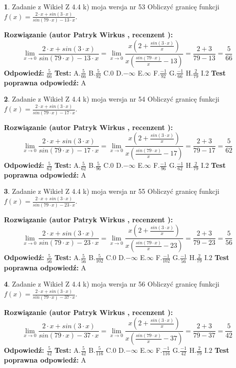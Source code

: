 \documentclass[12pt, a4paper]{article}
\theoremstyle{definition} %
\newtheorem{zad}{}
\newcommand{\zadStart}[1]{\begin{zad}#1\newline}
\newcommand{\zadStop}{\end{zad}}
\newcommand{\rozwStart}[2]{\noindent \textbf{Rozwiązanie (autor #1 , recenzent #2): }\newline}
\newcommand{\rozwStop}{\newline}
\newcommand{\odpStart}{\noindent \textbf{Odpowiedź:}\newline}
\newcommand{\odpStop}{\newline}
\newcommand{\testStart}{\noindent \textbf{Test:}\newline}
\newcommand{\testStop}{\newline}
\newcommand{\kluczStart}{\noindent \textbf{Test poprawna odpowiedź:}\newline}
\newcommand{\kluczStop}{\newline}
\begin{document}
\zadStart{Zadanie z Wikieł Z 4.4 k) moja wersja nr 53}
Obliczyć granicę funkcji $f(x)=\frac{2\cdot x +sin(3\cdot x)}{sin(79\cdot x) -13\cdot x}$.
\zadStop
\rozwStart{Patryk Wirkus}{}
$$\lim\limits_{x\to 0}\frac{2\cdot x +sin(3\cdot x)}{sin(79\cdot x) -13\cdot x}
=\lim\limits_{x\to 0}\frac{x(2+\frac{sin(3\cdot x)}{x})}{x(\frac{sin(79\cdot x)}{x}-13)}
=\frac{2+3}{79-13} = \frac{5}{66}$$
\rozwStop
\odpStart
$\frac{5}{66}$
\odpStop
\testStart
A.$\frac{5}{66}$
B.$\frac{5}{92}$
C.$0$
D.$-\infty$
E.$\infty$
F.$\frac{-1}{92}$
G.$\frac{-1}{66}$
H.$\frac{2}{79}$
I.$2$
\testStop
\kluczStart
A
\kluczStop



\zadStart{Zadanie z Wikieł Z 4.4 k) moja wersja nr 54}
Obliczyć granicę funkcji $f(x)=\frac{2\cdot x +sin(3\cdot x)}{sin(79\cdot x) -17\cdot x}$.
\zadStop
\rozwStart{Patryk Wirkus}{}
$$\lim\limits_{x\to 0}\frac{2\cdot x +sin(3\cdot x)}{sin(79\cdot x) -17\cdot x}
=\lim\limits_{x\to 0}\frac{x(2+\frac{sin(3\cdot x)}{x})}{x(\frac{sin(79\cdot x)}{x}-17)}
=\frac{2+3}{79-17} = \frac{5}{62}$$
\rozwStop
\odpStart
$\frac{5}{62}$
\odpStop
\testStart
A.$\frac{5}{62}$
B.$\frac{5}{96}$
C.$0$
D.$-\infty$
E.$\infty$
F.$\frac{-1}{96}$
G.$\frac{-1}{62}$
H.$\frac{2}{79}$
I.$2$
\testStop
\kluczStart
A
\kluczStop



\zadStart{Zadanie z Wikieł Z 4.4 k) moja wersja nr 55}
Obliczyć granicę funkcji $f(x)=\frac{2\cdot x +sin(3\cdot x)}{sin(79\cdot x) -23\cdot x}$.
\zadStop
\rozwStart{Patryk Wirkus}{}
$$\lim\limits_{x\to 0}\frac{2\cdot x +sin(3\cdot x)}{sin(79\cdot x) -23\cdot x}
=\lim\limits_{x\to 0}\frac{x(2+\frac{sin(3\cdot x)}{x})}{x(\frac{sin(79\cdot x)}{x}-23)}
=\frac{2+3}{79-23} = \frac{5}{56}$$
\rozwStop
\odpStart
$\frac{5}{56}$
\odpStop
\testStart
A.$\frac{5}{56}$
B.$\frac{5}{102}$
C.$0$
D.$-\infty$
E.$\infty$
F.$\frac{-1}{102}$
G.$\frac{-1}{56}$
H.$\frac{2}{79}$
I.$2$
\testStop
\kluczStart
A
\kluczStop



\zadStart{Zadanie z Wikieł Z 4.4 k) moja wersja nr 56}
Obliczyć granicę funkcji $f(x)=\frac{2\cdot x +sin(3\cdot x)}{sin(79\cdot x) -37\cdot x}$.
\zadStop
\rozwStart{Patryk Wirkus}{}
$$\lim\limits_{x\to 0}\frac{2\cdot x +sin(3\cdot x)}{sin(79\cdot x) -37\cdot x}
=\lim\limits_{x\to 0}\frac{x(2+\frac{sin(3\cdot x)}{x})}{x(\frac{sin(79\cdot x)}{x}-37)}
=\frac{2+3}{79-37} = \frac{5}{42}$$
\rozwStop
\odpStart
$\frac{5}{42}$
\odpStop
\testStart
A.$\frac{5}{42}$
B.$\frac{5}{116}$
C.$0$
D.$-\infty$
E.$\infty$
F.$\frac{-1}{116}$
G.$\frac{-1}{42}$
H.$\frac{2}{79}$
I.$2$
\testStop
\kluczStart
A
\kluczStop
\end{document}
